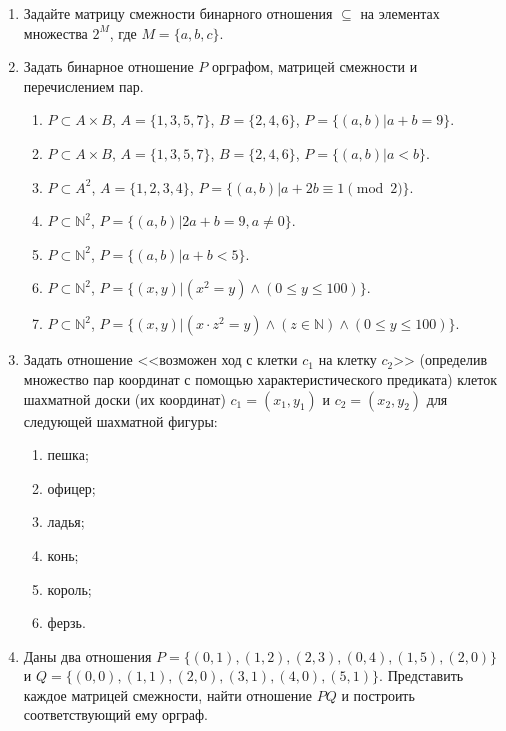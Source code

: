 \begin{enumerate}
    \item Задайте матрицу смежности бинарного отношения $\subseteq$ на элементах множества $2^M$, где $M=\{a,b,c\}$.

    \item Задать бинарное отношение $P$ орграфом, матрицей смежности и перечислением пар.
    \begin{enumerate}
        \item  $P\subset A\times B$, $A=\{1,3,5,7\}$, $B=\{2,4,6\}$, $P=\{(a,b)|a+b=9\}$.
        \item  $P\subset A\times B$, $A=\{1,3,5,7\}$, $B=\{2,4,6\}$, $P=\{(a,b)|a<b\}$.
    
        \item $P\subset A^2$, $A=\{1,2,3,4\}$, $P=\{(a,b)|a+2b\equiv 1\pmod{2}\}$.
        \item $P\subset \mathbb{N}^2$, $P=\{(a,b)|2a+b=9,a\neq 0\}$.
        \item $P\subset \mathbb{N}^2$, $P=\{(a,b)|a+b<5\}$.
        
        \item $P\subset \mathbb{N}^2$, $P=\{(x,y)|(x^2=y)\land (0\leq y\leq 100)\}$.
        \item $P\subset \mathbb{N}^2$, $P=\{(x,y)|(x\cdot z^2=y)\land (z\in\mathbb{N})\land (0\leq y\leq 100)\}$.        
    \end{enumerate}
    
    
    \item Задать отношение <<возможен ход с клетки $c_1$ на клетку $c_2$>> (определив множество пар координат с помощью характеристического предиката) клеток шахматной доски (их координат) $c_1=(x_1,y_1)$ и $c_2=(x_2,y_2)$ для следующей шахматной фигуры:
    \begin{enumerate}
        \item пешка;
        \item офицер;
        \item ладья;
        \item конь;
        \item король;
        \item ферзь.
    \end{enumerate}
    
    \item Даны два отношения $P=\{(0,1),(1,2),(2,3),(0,4),(1,5),(2,0)\}$ и $Q=\{(0,0),(1,1),(2,0),(3,1),(4,0),(5,1)\}$. Представить каждое матрицей смежности, найти отношение $PQ$ и построить соответствующий ему орграф.
    

\end{enumerate}
